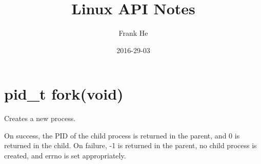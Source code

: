 \documentclass{article}
\title{Linux API Notes}
\date{2016-29-03}
\author{Frank He}
\begin{document}
\section{pid\_t fork(void)}

Creates a new process.

On success, the PID of the child process is returned in the parent, and 0 is returned in the child. On failure, -1 is returned in the parent, no child process is created, and errno is set appropriately.
\end{document}
